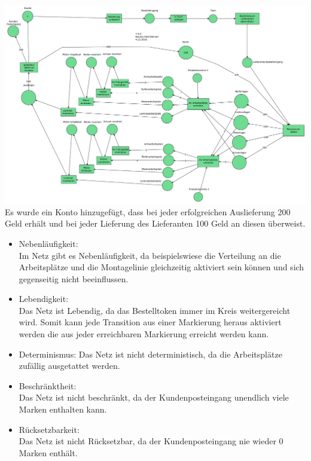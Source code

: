 \documentclass[a4paper,12pt]{scrartcl}
\begin{document}
\subsubsection{}
\includegraphics[scale=0.3]{G-6-A-07-Netz6-Buczko_Heid_Deinert.pdf}\\
Es wurde ein Konto hinzugefügt, dass bei jeder erfolgreichen Auslieferung 200 Geld erhält und bei jeder Lieferung des Lieferanten 100 Geld an diesen überweist.
\begin{itemize}
  \item{Nebenläufigkeit:}\\
  Im Netz gibt es Nebenläufigkeit, da beispielswiese die Verteilung an die Arbeitsplätze und die Montagelinie gleichzeitig aktiviert sein können und sich gegenseitig nicht beeinflussen.
  \item{Lebendigkeit:}\\
  Das Netz ist Lebendig, da das Bestelltoken immer im Kreis weitergereicht wird. Somit kann jede Transition aus einer Markierung heraus aktiviert werden die aus jeder erreichbaren Markierung erreicht werden kann.
  \item{Determinismus:}
  Das Netz ist nicht deterministisch, da die Arbeitsplätze zufällig ausgetattet werden.
  \item{Beschränktheit:}\\
  Das Netz ist nicht beschränkt, da der Kundenposteingang unendlich viele Marken enthalten kann.
  \item{Rücksetzbarkeit:}\\
  Das Netz ist nicht Rücksetzbar, da der Kundenposteingang nie wieder 0 Marken enthält.
\end{itemize}
\end{document}
